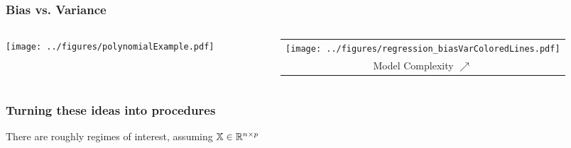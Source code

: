 \documentclass{beamer}
\begin{document}
\begin{frame}
\frametitle{Bias vs. Variance}
\begin{columns}[T]
    \begin{column}{.5\textwidth}
  \texttt{[image: ../figures/polynomialExample.pdf]}
  \end{column}
    \begin{column}{.5\textwidth}
    \begin{tabular}{c}
  \texttt{[image: ../figures/regression\_biasVarColoredLines.pdf]}   \\
  {\footnotesize Model Complexity $\nearrow$}
  \end{tabular}
   \end{column}
  \end{columns}
\vsp

\end{frame}



\begin{frame}
\frametitle{Turning these ideas into procedures}
There are roughly  regimes of interest, assuming $\mathbb{X} \in \mathbb{R}^{n \times p}$

\vsp
\begin{center}
\end{center}

\end{frame}
\end{document}
